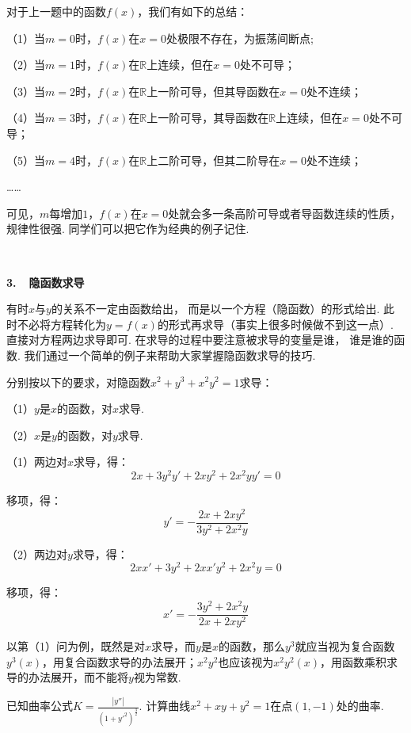 对于上一题中的函数$f(x)$，我们有如下的总结：\par
（1）当$m=0$时，$f(x)$在$x=0$处极限不存在，为振荡间断点;\par
（2）当$m=1$时，$f(x)$在$\mathbb{R}$上连续，但在$x=0$处不可导；\par
（3）当$m=2$时，$f(x)$在$\mathbb{R}$上一阶可导，但其导函数在$x=0$处不连续；\par
（4）当$m=3$时，$f(x)$在$\mathbb{R}$上一阶可导，其导函数在$\mathbb{R}$上连续，但在$x=0$处不可导；\par
（5）当$m=4$时，$f(x)$在$\mathbb{R}$上二阶可导，但其二阶导在$x=0$处不连续；\par
……\par
可见，$m$每增加$1$，$f(x)$在$x=0$处就会多一条高阶可导或者导函数连续的性质，规律性很强. 同学们可以把它作为经典的例子记住.\par
~\par
\textbf{3.~~隐函数求导}\vspace{0.25em}

有时$x$与$y$的关系不一定由函数给出，
而是以一个方程（隐函数）的形式给出.
此时不必将方程转化为$y=f(x)$的形式再求导（事实上很多时候做不到这一点）.
直接对方程两边求导即可.
在求导的过程中要注意被求导的变量是谁，
谁是谁的函数.
我们通过一个简单的例子来帮助大家掌握隐函数求导的技巧.

\begin{example}
\label{ex:ch02-05}
分别按以下的要求，对隐函数$x^2+y^3+x^{2}y^2=1$求导：\par
（1）$y$是$x$的函数，对$x$求导.\par
（2）$x$是$y$的函数，对$y$求导.
\end{example}

\begin{solution}
（1）两边对$x$求导，得：
$$
2x+3y^{2}y'+2xy^{2}+2x^{2}yy'=0
$$

移项，得：
$$
y'=-\frac{2x+2xy^2}{3y^2+2x^2y}
$$\par
（2）两边对$y$求导，得：
$$
2xx'+3y^2+2xx'y^{2}+2x^{2}y=0
$$

移项，得：
$$
x'=-\frac{3y^2+2x^2y}{2x+2xy^2}
$$
\end{solution}

以第（1）问为例，既然是对$x$求导，而$y$是$x$的函数，那么$y^3$就应当视为复合函数$y^3(x)$，用复合函数求导的办法展开；$x^{2}y^2$也应该视为$x^{2}y^2(x)$，用函数乘积求导的办法展开，而不能将$y$视为常数.

\begin{example}
\label{ex:ch02-06}
已知曲率公式$K = \frac{|y''|}{\left( 1+y'^{2}\right)^{\frac{3}{2}}}$.
计算曲线$x^2+xy+y^2=1$在点$(1,-1)$处的曲率.
\end{example}

